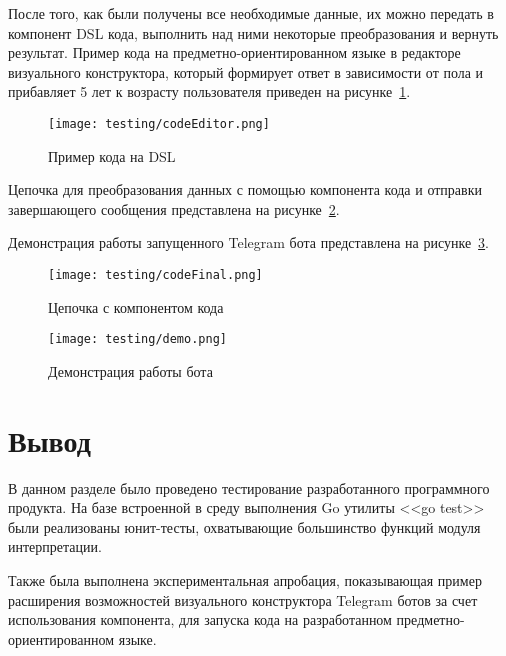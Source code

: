 После того, как были получены все необходимые данные, их можно передать в компонент DSL кода, выполнить над ними некоторые преобразования и вернуть результат.
Пример кода на предметно-ориентированном языке в редакторе визуального конструктора, который формирует ответ в зависимости от пола и прибавляет 5 лет к возрасту пользователя приведен на рисунке~\ref{f:codeEditor}.

\clearpage

\begin{figure}[!ht]
	\centering
	\texttt{[image: testing/codeEditor.png]}
	\caption{Пример кода на DSL}
	\label{f:codeEditor}
\end{figure}

Цепочка для преобразования данных с помощью компонента кода и отправки завершающего сообщения представлена на рисунке~\ref{f:experimentСodeFinal}.

Демонстрация работы запущенного Telegram бота представлена на рисунке~\ref{f:experimentDemo}.

\begin{figure}[!ht]
	\centering
	\vspace{\toppaddingoffigure}
	\texttt{[image: testing/codeFinal.png]}
	\caption{Цепочка с компонентом кода}
	\label{f:experimentСodeFinal}
\end{figure}

\begin{figure}[!ht]
	\centering
	\texttt{[image: testing/demo.png]}
	\caption{Демонстрация работы бота}
	\label{f:experimentDemo}
\end{figure}

\section*{Вывод}
В данном разделе было проведено тестирование разработанного программного продукта.
На базе встроенной в среду выполнения Go утилиты <<go test>> были реализованы юнит-тесты, охватывающие большинство функций модуля интерпретации.

Также была выполнена экспериментальная апробация, показывающая пример расширения возможностей визуального конструктора Telegram ботов
за счет использования компонента, для запуска кода на разработанном предметно-ориентированном языке.
\clearpage

